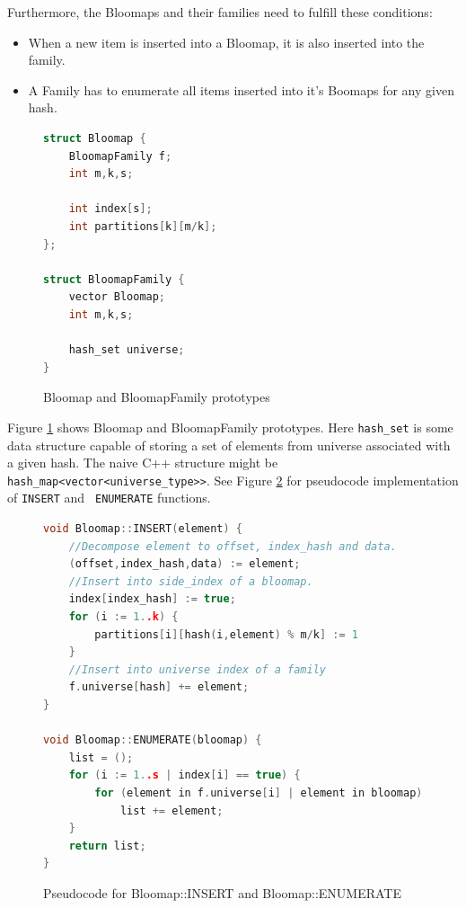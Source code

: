 Furthermore, the Bloomaps and their families need to fulfill these conditions:

\begin{itemize}
	\item When a new item is inserted into a Bloomap, it is also inserted into
		the family.
	\item A Family has to enumerate all items inserted into it's Boomaps for any
		given hash.
\end{itemize}


\begin{figure}[!ht]
\begin{tcolorbox}
	\begin{lstlisting}[language=c++,tabsize=2]
struct Bloomap {
    BloomapFamily f;
    int m,k,s;

    int index[s];
    int partitions[k][m/k];
};

struct BloomapFamily {
    vector Bloomap;
    int m,k,s;

    hash_set universe;
}
\end{lstlisting}
\end{tcolorbox}
\caption{Bloomap and BloomapFamily prototypes}
\label{figure-bloomap-decl}
\end{figure}

Figure \ref{figure-bloomap-decl} shows Bloomap and BloomapFamily prototypes.
Here {\tt hash\_set} is some data structure capable of storing a set of
elements from universe associated with a given hash. The naive C++ structure
might be {\tt hash\_map<vector<universe\_type>>}. See Figure
\ref{figure-bloomap-fn} for pseudocode implementation of {\tt INSERT} and {\tt
ENUMERATE} functions.

\begin{figure}[!ht]
\begin{tcolorbox}
\begin{lstlisting}[language=c++,tabsize=2]
void Bloomap::INSERT(element) {
    //Decompose element to offset, index_hash and data.
    (offset,index_hash,data) := element;
    //Insert into side_index of a bloomap.
    index[index_hash] := true;
    for (i := 1..k) {
        partitions[i][hash(i,element) % m/k] := 1
    }
    //Insert into universe index of a family
    f.universe[hash] += element;
}

void Bloomap::ENUMERATE(bloomap) {
    list = ();
	for (i := 1..s | index[i] == true) {
        for (element in f.universe[i] | element in bloomap) 
            list += element;
    }
    return list;
}
\end{lstlisting}
\end{tcolorbox}
\caption{Pseudocode for Bloomap::INSERT and Bloomap::ENUMERATE}
\label{figure-bloomap-fn}
\end{figure}


